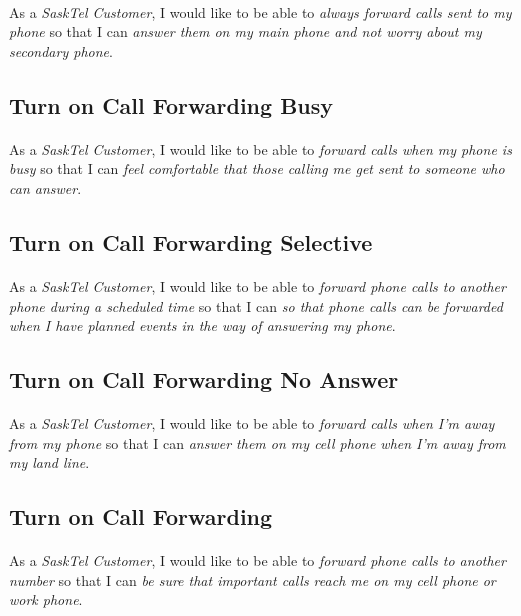 \documentclass[12pt]{article}
\begin{document}
\paragraph{}	As a \textit{SaskTel Customer}, I would like to be able to \textit{always forward calls sent to my phone} so that I can \textit{answer them on my main phone and not worry about my secondary phone}.

\subsection{Turn on Call Forwarding Busy}
\paragraph{}	As a \textit{SaskTel Customer}, I would like to be able to \textit{forward calls when my phone is busy} so that I can \textit{feel comfortable that those calling me get sent to someone who can answer}.

\subsection{Turn on Call Forwarding Selective}
\paragraph{}	As a \textit{SaskTel Customer}, I would like to be able to \textit{forward phone calls to another phone during a scheduled time} so that I can \textit{so that phone calls can be forwarded when I have planned events in the way of answering my phone}.

\subsection{Turn on Call Forwarding No Answer}
\paragraph{}	As a \textit{SaskTel Customer}, I would like to be able to \textit{forward calls when I'm away from my phone} so that I can \textit{answer them on my cell phone when I'm away from my land line}.

\subsection{Turn on Call Forwarding}
\paragraph{}	As a \textit{SaskTel Customer}, I would like to be able to \textit{forward phone calls to another number} so that I can \textit{be sure that important calls reach me on my cell phone or work phone}.
\end{document}
